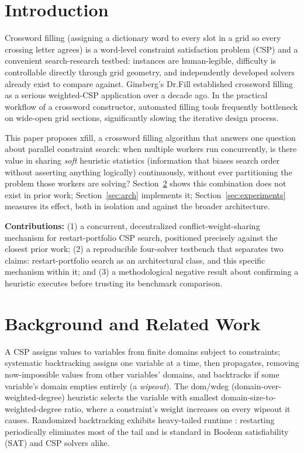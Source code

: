 \documentclass[conference]{IEEEtran}
\begin{document}
\section{Introduction}

Crossword filling (assigning a dictionary word to every slot in a grid so every crossing letter agrees) is a word-level constraint satisfaction problem (CSP) and a convenient search-research testbed: instances are human-legible, difficulty is controllable directly through grid geometry, and independently developed solvers already exist to compare against. Ginsberg's Dr.Fill \cite{ginsberg2011} established crossword filling as a serious weighted-CSP application over a decade ago. In the practical workflow of a crossword constructor, automated filling tools frequently bottleneck on wide-open grid sections, significantly slowing the iterative design process.

This paper proposes xfill, a crossword filling algorithm that answers one question about parallel constraint search: when multiple workers run concurrently, is there value in sharing \textit{soft} heuristic statistics (information that biases search order without asserting anything logically) continuously, without ever partitioning the problem those workers are solving? Section~\ref{sec:relwork} shows this combination does not exist in prior work; Section~\ref{sec:arch} implements it; Section~\ref{sec:experiments} measures its effect, both in isolation and against the broader architecture.

\textbf{Contributions:} (1) a concurrent, decentralized conflict-weight-sharing mechanism for restart-portfolio CSP search, positioned precisely against the closest prior work; (2) a reproducible four-solver testbench that separates two claims: restart-portfolio search as an architectural class, and this specific mechanism within it; and (3) a methodological negative result about confirming a heuristic executes before trusting its benchmark comparison.

\section{Background and Related Work}
\label{sec:relwork}

A CSP assigns values to variables from finite domains subject to constraints; systematic backtracking assigns one variable at a time, then propagates, removing now-impossible values from other variables' domains, and backtracks if some variable's domain empties entirely (a \textit{wipeout}). The dom/wdeg (domain-over-weighted-degree) heuristic \cite{boussemart2004} selects the variable with smallest domain-size-to-weighted-degree ratio, where a constraint's weight increases on every wipeout it causes. Randomized backtracking exhibits heavy-tailed runtime \cite{gomes1998,gomes2000}: restarting periodically eliminates most of the tail and is standard in Boolean satisfiability (SAT) and CSP solvers alike.
\end{document}
